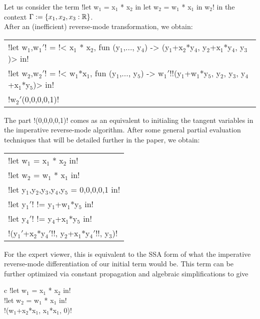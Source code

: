 \begin{example}[First-order term]
Let us consider the term !let w$_1$ = x$_1$ * x$_2$ in let w$_2$ = w$_1$ * x$_1$ in w$_2$! in the context $\Gamma:=\{x_1,x_2, x_3:\mathbb{R}\}$.\\
After an (inefficient) reverse-mode transformation, we obtain:
\begin{center}
    \begin{tabular}{l}
        !let w$_1$,w$_1'$! = !< x$_1$ * x$_2$, fun (y$_1$,$\ldots$, y$_4$) -> (y$_1$+x$_2$*y$_4$, y$_2$+x$_1$*y$_4$, y$_3$)> in!\\
        !let w$_2$,w$_2'$! = !< w$_1$*x$_1$, fun (y$_1$,$\ldots$, y$_5$) -> w$_1'$!!(y$_1$+w$_1$*y$_5$, y$_2$, y$_3$, y$_4$+x$_1$*y$_5$)> in!\\
        !w$_2'$(0,0,0,0,1)!
    \end{tabular}
\end{center}
The part !(0,0,0,0,1)! comes as an equivalent to initialing the tangent variables in the imperative reverse-mode algorithm. 
After some general partial evaluation techniques that will be detailed further in the paper, we obtain:    

    \begin{center}
            \begin{tabular}{l}
                !let w$_1$ = x$_1$ * x$_2$ in!\\ 
                !let w$_2$ = w$_1$ * x$_1$ in!\\
                !let y$_1$,y$_2$,y$_3$,y$_4$,y$_5$ = 0,0,0,0,1 in!\\
                !let y$_1'$! != y$_1$+w$_1$*y$_5$ in!\\
                !let y$_4'$! != y$_4$+x$_1$*y$_5$ in!\\
                !(y$_1'$+x$_2$*y$_4'$!!, y$_2$+x$_1$*y$_4'$!!, y$_3$)!
            \end{tabular}
    \end{center}   
For the expert viewer, this is equivalent to the SSA form \cite{cytron1989efficient} of what the imperative reverse-mode differentiation of our initial term would be.
This term can be further optimized via constant propagation and algebraic simplifications to give
        \begin{center}
            \begin{tabular}{{c}}
                !let w$_1$ = x$_1$ * x$_2$ in!\\ 
                !let w$_2$ = w$_1$ * x$_1$ in!\\
                !(w$_1$+x$_2$*x$_1$, x$_1$*x$_1$, 0)!
            \end{tabular}
        \end{center}
    \end{example}

